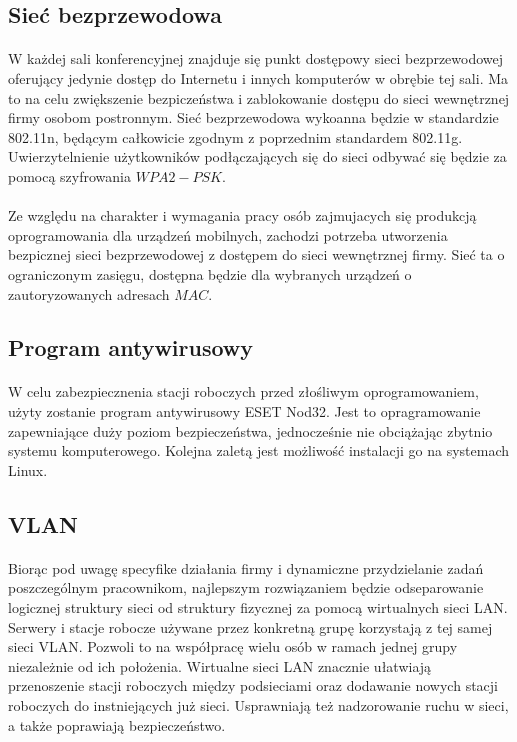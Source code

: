 \subsection{Sieć bezprzewodowa}
\paragraph{}
W każdej sali konferencyjnej znajduje się punkt dostępowy sieci bezprzewodowej  oferujący jedynie dostęp do Internetu i innych komputerów w obrębie tej sali. Ma to na celu zwiększenie bezpiczeństwa i zablokowanie dostępu do sieci wewnętrznej firmy osobom postronnym. Sieć bezprzewodowa wykoanna będzie w standardzie 802.11n, będącym całkowicie zgodnym z poprzednim standardem 802.11g. Uwierzytelnienie użytkowników podłączających się do sieci odbywać się będzie za pomocą szyfrowania $WPA2-PSK$.
\paragraph{}
Ze względu na charakter i wymagania pracy osób zajmujacych się produkcją oprogramowania dla urządzeń mobilnych, zachodzi potrzeba utworzenia bezpicznej sieci bezprzewodowej z dostępem do sieci wewnętrznej firmy. Sieć ta o ograniczonym zasięgu, dostępna będzie dla wybranych urządzeń o zautoryzowanych adresach $MAC$.

\subsection{Program antywirusowy}
\paragraph{}
W celu zabezpiecznenia stacji roboczych przed złośliwym oprogramowaniem, użyty zostanie program antywirusowy ESET Nod32. Jest to opragramowanie zapewniające duży poziom bezpieczeństwa, jednocześnie nie obciążając zbytnio systemu komputerowego. Kolejna zaletą jest możliwość instalacji go na systemach Linux.

\subsection{VLAN}
\paragraph{}
Biorąc pod uwagę specyfike działania firmy i dynamiczne przydzielanie zadań poszczególnym pracownikom, najlepszym rozwiązaniem będzie odseparowanie logicznej struktury sieci od struktury fizycznej za pomocą wirtualnych sieci LAN. Serwery i stacje robocze używane przez konkretną grupę korzystają z tej samej sieci VLAN. Pozwoli to na współpracę wielu osób w ramach jednej grupy niezależnie od ich położenia. Wirtualne sieci LAN znacznie ułatwiają przenoszenie stacji roboczych między podsieciami oraz dodawanie nowych stacji roboczych do instniejących już sieci. Usprawniają też nadzorowanie ruchu w sieci, a także poprawiają bezpieczeństwo.


